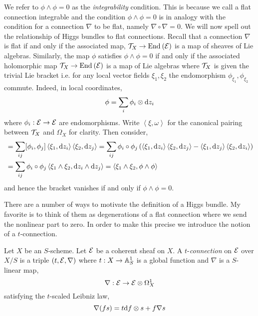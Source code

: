 \documentclass[12pt]{article}
\begin{document}
\newcommand{\inner}[2]{\left< #1, #2 \right>}

\begin{rmk}
We refer to $\phi \wedge \phi = 0$ as the \textit{integrability} condition. This is because we call a flat connection integrable and the condition $\phi \wedge \phi = 0$ is in analogy with the condition for a connection $\nabla$ to be flat, namely $\nabla \circ \nabla = 0$. We will now spell out the relationship of Higgs bundles to flat connections. Recall that a connection $\nabla$ is flat if and only if the associated map, $\mathcal{T}_X \to \mathrm{End}_{} \left( \mathcal{E} \right)$
is a map of sheaves of Lie algebras. Similarly, the map $\phi$ satisfies $\phi \wedge \phi = 0$ if and only if the associated holomorphic map $\mathcal{T}_X \to \mathrm{End}_{} \left( \mathcal{E} \right)$ is a map of Lie algebras where $\mathcal{T}_X$ is given the trivial Lie bracket i.e. for any local vector fields $\xi_1, \xi_2$ the endomorphism $\phi_{\xi_1}, \phi_{\xi_2}$ commute. Indeed, in local coordinates,
\[ \phi = \sum_i \phi_i \otimes \mathrm{d}{z_i} \]
where $\phi_i : \mathcal{E} \to \mathcal{E}$ are endomorphisms. Write $\inner{\xi}{\omega}$ for the canonical pairing between $\mathcal{T}_X$ and $\Omega_X$ for clarity. Then consider,
\begin{align*}
[\phi_{\xi_1}, \phi_{\xi_2}] &= \sum_{ij} [\phi_i, \phi_j] \inner{\xi_1}{\d{z_i}} \inner{\xi_2}{\d{z_j}} = \sum_{ij} \phi_i \circ \phi_j \left( \inner{\xi_1}{\d{z_i}} \inner{\xi_2}{\d{z_j}} - \inner{\xi_1}{\d{z_j}} \inner{\xi_2}{\d{z_i}} \right) 
\\
& = \sum_{ij} \phi_i \circ \phi_j \inner{\xi_1 \wedge \xi_2}{\d{z_i} \wedge \d{z_j}} = \inner{\xi_1 \wedge \xi_2}{\phi \wedge \phi}
\end{align*}
and hence the bracket vanishes if and only if $\phi \wedge \phi = 0$.
\end{rmk}

There are a number of ways to motivate the definition of a Higgs bundle. My favorite is to think of them as degenerations of a flat connection where we send the nonlinear part to zero. In order to make this precise we introduce the notion of a $t$-connection.

\begin{defn}
Let $X$ be an $S$-scheme. Let $\mathcal{E}$ be a coherent sheaf on $X$. A $t$-\textit{connection} on $\mathcal{E}$ over $X/S$ is a triple $(t, \mathcal{E}, \nabla)$ where $t : X \to \mathbb{A}^1_S$ is a global function and $\nabla$ is a $S$-linear map,
\[ \nabla : \mathcal{E} \to \mathcal{E} \otimes \Omega^1_X \]
satisfying the $t$-scaled Leibniz law,
\[ \nabla(f s) = t \mathrm{d}{f} \otimes s + f \nabla s \] 
\end{defn}
\end{document}

